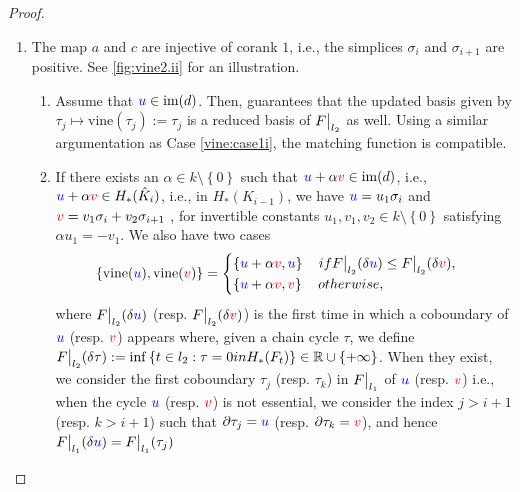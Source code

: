 \documentclass{article}
\newcommand{\field}{k}
\newcommand{\vine}{\mathrm{vine}}
\newcommand\restr[2]{{  \left.\kern-\nulldelimiterspace #1 \vphantom{\big|} \right|_{#2}  }}
\begin{document}
\begin{proof}
\begin{enumerate}
\begin{figure}[H]
\begin{subfigure}[b]{.45\textwidth}
				\end{subfigure}
				\caption{Vineyard case: $\sigma_i$ and $\sigma _{i+1 }$ negative.}
			\end{figure}
		\item The map $a$ and $c$ are injective of corank $1$, i.e., the
			simplices $\sigma_i$ and $\sigma_{i+1}$ are positive.
			See \cref{fig:vine2.ii} for an illustration.
			\begin{enumerate}
				\item \label{vine:case2i} Assume that ${\color{blue} u}\in \mathrm{im}(d)$.
					Then, {\cite[Theorem~2.4]{mariaZigzagPersistenceReflections2015}}
					guarantees that the updated basis given by
					$\tau_j\mapsto \vine \left( \tau_j \right) := \tau_j$
					is a reduced basis of $\restr F {l_2}$ as well.
					Using a similar argumentation as
					Case \ref{vine:case1i}, the matching function is compatible.
				\item \label{vine:case2ii} If there exists an $\alpha \in k
					\setminus \left\{ 0 \right\} $ such that ${\color{blue} u} + \alpha {\ensuremath{\color{red} v}}\in
					\mathrm{im}(d)$, i.e., ${\color{blue} u} + \alpha{\ensuremath{\color{red} v}} \in H_*(\hat K_i)$, i.e., in
					$H_*(K_{i-1})$, we have ${\color{blue} u} = u_1 \sigma_i$ and ${\color{red} v} = v_1 \sigma_i + v_2
					\sigma_{i+1}$ , for invertible constants $u_1,v_1, v_2 \in \field \setminus \left\{ 0  \right\}$ satisfying $\alpha u_1 = -v_1$.
					We also have two cases
					\begin{equation*}
						\left\{ \vine(\u), \vine(\v) \right\} =
						\begin{cases}
							\left\{  \u+\alpha\v, \u \right\} \quad \textnormal{if }\restr F {l_2}(\delta\u) \le \restr F {l_2} (\delta\v), \\
							\left\{  \u+\alpha\v,\v \right\} \quad \textnormal{otherwise,}
						\end{cases}
					\end{equation*}
					where $\restr F {l_2} (\delta \u)$ (resp. $\restr F {l_2} (\delta \v)$)
					is the first time in which a coboundary of ${\color{blue} u}$ (resp. ${\color{red} v}$) appears where, given a chain cycle $\tau$, we define
					$\restr F {l_2} (\delta \tau):= \inf \left\{ t\in l_2 : \tau
					= 0 \textnormal{ in } H_*(F_t)\right\}\in \mathbb R \cup
					\left\{ +\infty \right\} $.
					When they exist, we consider the first coboundary $\tau_j$
					(resp. $\tau_k$) in
					$\restr F {l_1}$ of ${\color{blue} u}$ (resp. ${\color{red} v}$) i.e., when the cycle ${\color{blue} u}$
					(resp. ${\color{red} v}$) is not essential, we consider the index $j>i+1$
					(resp. $k>i+1$) such that
					$\partial \tau_j = {\color{blue} u}$ (resp. $\partial \tau_k = {\color{red} v}$),
					and hence $\restr F {l_1}(\delta\u) = \restr F {l_1} (\tau_j)$

\end{enumerate}
\end{enumerate}
\end{proof}
\end{document}

